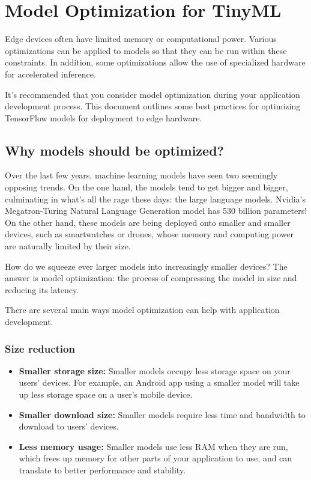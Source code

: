 %
%

\chapter{Model Optimization for TinyML}
\label{sec:model_optimization}
Edge devices often have limited memory or computational power. Various optimizations can be applied to models so that they can be run within these constraints. In addition, some optimizations allow the use of specialized hardware for accelerated inference.

It's recommended that you consider model optimization during your application development process. This document outlines some best practices for optimizing TensorFlow models for deployment to edge hardware.

\section{Why models should be optimized?}
Over the last few years, machine learning models have seen two seemingly opposing trends. On the one hand, the models tend to get bigger and bigger, culminating in what’s all the rage these days: the large language models. Nvidia’s Megatron-Turing Natural Language Generation model has 530 billion parameters! On the other hand, these models are being deployed onto smaller and smaller devices, such as smartwatches or drones, whose memory and computing power are naturally limited by their size.

How do we squeeze ever larger models into increasingly smaller devices? The answer is model optimization: the process of compressing the model in size and reducing its latency. \cite{datascienceModelOptimization:2024}

There are several main ways model optimization can help with application development. \cite{tfl_Opt:2024}

\subsection{Size reduction}
\begin{itemize}
	\item \textbf{Smaller storage size:} Smaller models occupy less storage space on your users' devices. For example, an Android app using a smaller model will take up less storage space on a user's mobile device.
	\item \textbf{Smaller download size:} Smaller models require less time and bandwidth to download to users' devices.
	\item \textbf{Less memory usage:} Smaller models use less RAM when they are run, which frees up memory for other parts of your application to use, and can translate to better performance and stability. \cite{tfl_Opt:2024}
\end{itemize}

